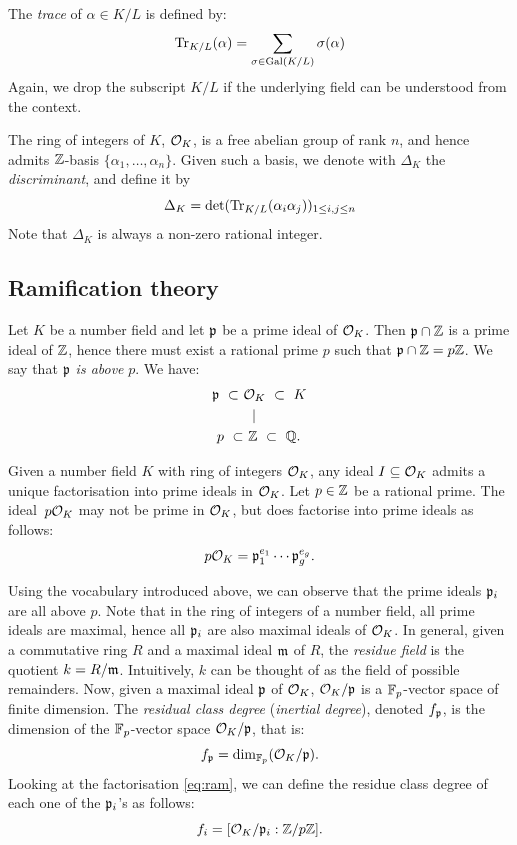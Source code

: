 The \emph{trace} of $\alpha \in K/L$ is defined by:
\[ \operatorname{Tr}_{K/L}(\alpha) = \sum_{\sigma \in \operatorname{Gal}(K/L)} \sigma(\alpha) \]
Again, we drop the subscript $K/L$ if the underlying field can be understood from the context.

The ring of integers of $K$, $\mathcal{O}_K$, is a free abelian group of rank $n$, and hence admits $\mathbb{Z}$-basis $\{\alpha_1, \ldots, \alpha_n\}$. Given such a basis, we denote with $\Delta_K$ the \emph{discriminant}, and define it by
\[ \Delta_K = \det(\operatorname{Tr}_{K/L}(\alpha_i\alpha_j))_{1\leq i,j \leq n}\]
Note that $\Delta_K$ is always a non-zero rational integer.





\subsection{Ramification theory}
Let $K$ be a number field and let $\mathfrak{p}$ be a prime ideal of $\mathcal{O}_K$. Then $\mathfrak{p} \cap \mathbb{Z}$ is a prime ideal of $\mathbb{Z}$, hence there must exist a rational prime  $p$ such that $\mathfrak{p} \cap \mathbb{Z} = p\mathbb{Z}$. We say that $\mathfrak{p}$ \emph{is above} $p$. We have:
\begin{align*} 
\mathfrak{p} \ \subset \  & \mathcal{O}_K \  \subset \ K \\
 &~\mid \\
 p \ \subset &\ \mathbb{Z} \ \subset \ \mathbb{Q}. 
\end{align*}

Given a number field $K$ with ring of integers $\mathcal{O}_K$, any ideal $I\subseteq\mathcal{O}_K$ admits a unique factorisation into prime ideals in $\mathcal{O}_K$. Let $p\in\mathbb{Z}$ be a rational prime. The ideal~$p\mathcal{O}_K$ may not be prime in $\mathcal{O}_K$, but does factorise into prime ideals as follows:
\begin{equation}\label{eq:ram} p\mathcal{O}_K = \mathfrak{p}_1^{e_1} \cdots \mathfrak{p}_g^{e_g}. 
\end{equation}


Using the vocabulary introduced above, we can observe that the prime ideals $\mathfrak{p}_i$ are all above $p$. 
Note that in the ring of integers of a number field, all prime ideals are maximal, hence all $\mathfrak{p}_i$ are also maximal ideals of $\mathcal{O}_K$.
In general, given a commutative ring $R$ and a maximal ideal $\mathfrak{m}$ of $R$, the \emph{residue field} is the quotient $k = R/\mathfrak{m}$. Intuitively, $k$ can be thought of as the field of possible remainders. Now, given a maximal ideal $\mathfrak{p}$ of $\mathcal{O}_K$, $\mathcal{O}_K/\mathfrak{p}$ is a $\mathbb{F}_p$-vector space of finite dimension. The \emph{residual class degree} (\emph{inertial degree}), denoted $f_{\mathfrak{p}}$, is the dimension of the $\mathbb{F}_p$-vector space $\mathcal{O}_K/\mathfrak{p}$, that is:
\[ f_{\mathfrak{p}} = \dim_{\mathbb{F}_p}(\mathcal{O}_K/\mathfrak{p}).\]
Looking at the factorisation \eqref{eq:ram}, we can define the residue class degree of each one of the $\mathfrak{p}_i$'s as follows:
    \[ f_i = [ \mathcal{O}_K/\mathfrak{p}_i : \mathbb{Z}/p\mathbb{Z} ]. \]

